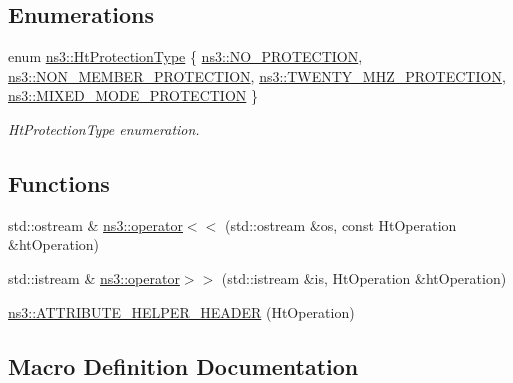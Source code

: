 \subsection*{Enumerations}
\begin{DoxyCompactItemize}
\item 
enum \hyperlink{namespacens3_a5298e425f21042471c21b3089e862195}{ns3\+::\+Ht\+Protection\+Type} \{ \hyperlink{namespacens3_a5298e425f21042471c21b3089e862195aa3c011b4a436b4d55993f0a5a6380caa}{ns3\+::\+N\+O\+\_\+\+P\+R\+O\+T\+E\+C\+T\+I\+ON}, 
\hyperlink{namespacens3_a5298e425f21042471c21b3089e862195a0d0e843697105d5ad5d06d2c8cbd99ac}{ns3\+::\+N\+O\+N\+\_\+\+M\+E\+M\+B\+E\+R\+\_\+\+P\+R\+O\+T\+E\+C\+T\+I\+ON}, 
\hyperlink{namespacens3_a5298e425f21042471c21b3089e862195ac92b603691ba04ce3a635103dede4426}{ns3\+::\+T\+W\+E\+N\+T\+Y\+\_\+\+M\+H\+Z\+\_\+\+P\+R\+O\+T\+E\+C\+T\+I\+ON}, 
\hyperlink{namespacens3_a5298e425f21042471c21b3089e862195af0057fb3d5ffc6dbd305b04e1e684d84}{ns3\+::\+M\+I\+X\+E\+D\+\_\+\+M\+O\+D\+E\+\_\+\+P\+R\+O\+T\+E\+C\+T\+I\+ON}
 \}\begin{DoxyCompactList}\small\item\em Ht\+Protection\+Type enumeration. \end{DoxyCompactList}
\end{DoxyCompactItemize}
\subsection*{Functions}
\begin{DoxyCompactItemize}
\item 
std\+::ostream \& \hyperlink{namespacens3_ae717a480741ca14507b3c209fae97878}{ns3\+::operator$<$$<$} (std\+::ostream \&os, const Ht\+Operation \&ht\+Operation)
\item 
std\+::istream \& \hyperlink{namespacens3_a9c588b04f777c3f6890b9709e7732afb}{ns3\+::operator$>$$>$} (std\+::istream \&is, Ht\+Operation \&ht\+Operation)
\item 
\hyperlink{namespacens3_a9d77b72d08fc050969249a6edf7aaab4}{ns3\+::\+A\+T\+T\+R\+I\+B\+U\+T\+E\+\_\+\+H\+E\+L\+P\+E\+R\+\_\+\+H\+E\+A\+D\+ER} (Ht\+Operation)
\end{DoxyCompactItemize}


\subsection{Macro Definition Documentation}
